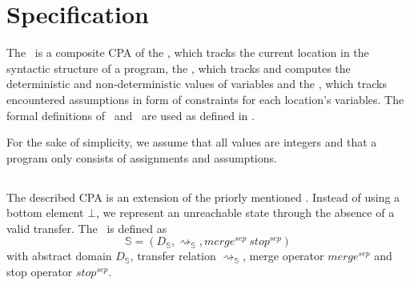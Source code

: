 \newcommand{\symex}{\mathbb{S}}

\newcommand{\constraints}{\mathbb{C}}
\newcommand{\location}{\mathbb{L}}
\newcommand{\composition}{\mathcal{C}}

\newcommand{\transfer}{\rightsquigarrow}
\newcommand{\gtransfer}{\overset{g}{\transfer}}
\newcommand{\strengthen}{\downarrow}

\newcommand{\valueset}{\mathscr{Z}}
\newcommand{\integerset}{\mathbb{Z}}

\newcommand{\symlattice}{\mathscr{E}}
\newcommand{\symidset}{S_I}
\newcommand{\symexpset}{S_E}

\newcommand{\constraintlattice}{\mathscr{C}}

\newcommand{\llbracket}{[\![}
\newcommand{\rrbracket}{]\!]}
\newcommand{\concretization}{\llbracket \cdot \rrbracket}
\newcommand{\lesserEqual}{\sqsubseteq}
\newcommand{\leastupperbound}{\sqcup}

\newcommand{\satisfies}{\vDash}

\section{Specification}
The \symbolicExecutionCPA\ is a composite CPA of the \emph{\locationCPA}, which tracks the current location in the syntactic structure of a program,
the \emph{\symbolicValueCPA}, which tracks and computes the deterministic and non-deterministic values of variables and
the \emph{\constraintsCPA}, which tracks encountered assumptions in form of constraints for each location's variables. The formal definitions of \compositeCPA\ and \locationCPA\ are used as defined in \cite{Beyer2007}.

For the sake of simplicity, we assume that all values are integers and that a program only consists of assignments and assumptions.

\subsection{\symbolicValueCPA}
The described CPA is an extension of the priorly mentioned .
Instead of using a bottom element $\bot$, we represent an unreachable state through the absence of a valid transfer.
The \symbolicValueCPA\ is defined as
\[\symex = (D_\symex, \transfer_\symex, merge^{sep}\ stop^{sep})\]
with abstract domain $D_\symex$, transfer relation $\transfer_\symex$, merge operator $merge^{sep}$ and stop operator $stop^{sep}$.

